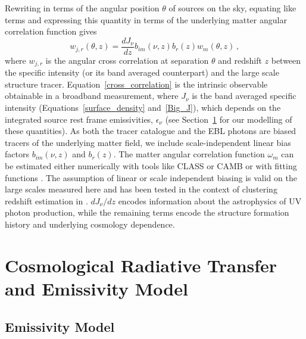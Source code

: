 \documentclass[fleqn,usenatbib]{mnras}
\begin{document}
Rewriting in terms of the angular position $\theta$ of sources on the sky, 
equating like terms and expressing this quantity in terms of the underlying matter angular correlation function gives \citep{mnard2013clusteringbased}
\begin{equation}
\label{cross_correlation}
w_{j,r}(\theta,z) = \frac{dJ_\nu}{dz} b_{im}(\nu,z) b_r (z) w_m(\theta,z)\,,
\end{equation}
where $w_{j,r}$ is the angular cross correlation at separation $\theta$ and redshift $z$ between the specific intensity (or its band averaged counterpart) and the large scale structure tracer. Equation~\ref{cross_correlation} is the intrinsic observable obtainable in a broadband measurement, where $J_{\nu}$ is the band averaged specific intensity (Equations~\ref{surface_density} and~\ref{Big_J}), which depends on the integrated source rest frame emissivities, $\epsilon_\nu$ (see Section~\ref{sec:RT} for our modelling of these quantities). As both the tracer catalogue and the EBL photons are biased tracers of the underlying matter field, we include scale-independent linear bias factors $b_{im}(\nu, z)$ and $b_r(z)$. The matter angular correlation function $\omega_m$ can be estimated either numerically with tools like CLASS \citep{Blas_2011} or CAMB \citep{Lewis_2000} or with fitting functions \citep{Maller2005}. The assumption of linear or scale independent biasing is valid on the large scales measured here and has been tested in the context of clustering redshift estimation in \citep{Schmidt2013,Rahman2015}. $dJ_{\nu}/dz$ encodes information about the astrophysics of UV photon production, while the remaining terms encode the structure formation history and underlying cosmology dependence.


\section{Cosmological Radiative Transfer and Emissivity Model} 
\label{sec:RT}

\subsection{Emissivity Model}
\label{sec:emissivity}
\end{document}
